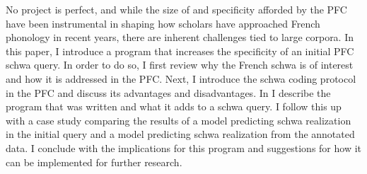 \documentclass[output=paper,colorlinks,citecolor=brown,
]{langscibook}
\begin{document}
No project is perfect, and while the size of and specificity afforded by the PFC have been instrumental in shaping how scholars have approached French phonology in recent years, there are inherent challenges tied to large corpora. In this paper, I introduce a program that increases the specificity of an initial PFC schwa query. In order to do so, I first review why the French schwa is of interest and how it is addressed in the PFC. Next, I introduce the schwa coding protocol in the PFC and discuss its advantages and disadvantages. In  I describe the program that was written and what it adds to a schwa query. I follow this up with a case study comparing the results of a model predicting schwa realization in the initial query and a model predicting schwa realization from the annotated data. I conclude with the implications for this program and suggestions for how it can be implemented for further research.
\end{document}

